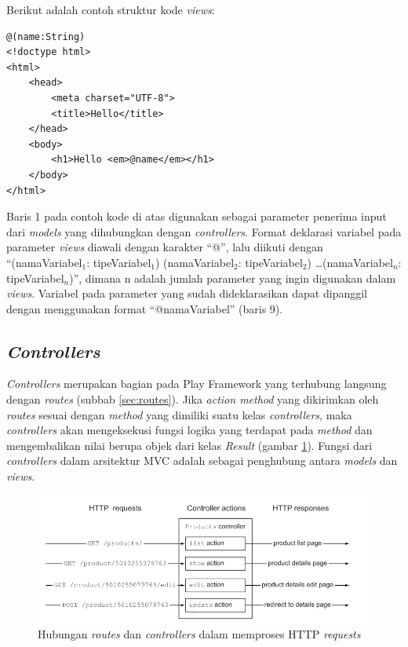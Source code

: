 Berikut adalah contoh struktur kode \textit{views}:

\begin{lstlisting}
@(name:String)
<!doctype html>
<html>
	<head>
		<meta charset="UTF-8">
		<title>Hello</title>
	</head>
	<body>
		<h1>Hello <em>@name</em></h1>
	</body>
</html>
\end{lstlisting}

Baris 1 pada contoh kode di atas digunakan sebagai parameter penerima input dari \textit{models} yang dihubungkan dengan \textit{controllers}. Format deklarasi variabel pada parameter \textit{views} diawali dengan karakter ``@'', lalu diikuti dengan ``(namaVariabel$_1$: tipeVariabel$_1$) (namaVariabel$_2$: tipeVariabel$_2$) \ldots (namaVariabel$_n$: tipeVariabel$_n$)'', dimana n adalah jumlah parameter yang ingin digunakan dalam \textit{views}. Variabel pada parameter yang sudah dideklarasikan dapat dipanggil dengan menggunakan format ``@namaVariabel'' (baris 9).

\subsection{\textit{Controllers}}
\label{sec:controllers}
\textit{Controllers} merupakan bagian pada Play Framework yang terhubung langsung dengan \textit{routes} (subbab \ref{sec:routes}). Jika \textit{action method} yang dikirimkan oleh \textit{routes} sesuai dengan \textit{method} yang dimiliki suatu kelas \textit{controllers}, maka \textit{controllers} akan mengeksekusi fungsi logika yang terdapat pada \textit{method} dan mengembalikan nilai berupa objek dari kelas \textit{Result} (gambar \ref{fig:2_controllers1}). Fungsi dari \textit{controllers} dalam arsitektur MVC adalah sebagai penghubung antara \textit{models} dan \textit{views}. 

\begin{figure}[htbp]
	\centering	
		\includegraphics[scale=0.7]{Gambar/2_controllers1.PNG}
	\caption{Hubungan \textit{routes} dan \textit{controllers} dalam memproses HTTP \textit{requests}\cite{playforjava}}
	\label{fig:2_controllers1}
\end{figure}

